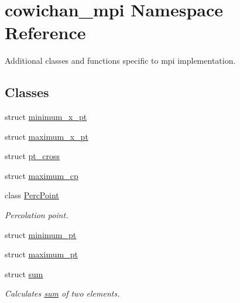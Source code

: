 \hypertarget{namespacecowichan__mpi}{
\section{cowichan\_\-mpi Namespace Reference}
\label{namespacecowichan__mpi}
}
Additional classes and functions specific to mpi implementation.  


\subsection*{Classes}
\begin{CompactItemize}
\item 
struct \hyperlink{structcowichan__mpi_1_1minimum__x__pt}{minimum\_\-x\_\-pt}
\item 
struct \hyperlink{structcowichan__mpi_1_1maximum__x__pt}{maximum\_\-x\_\-pt}
\item 
struct \hyperlink{structcowichan__mpi_1_1pt__cross}{pt\_\-cross}
\item 
struct \hyperlink{structcowichan__mpi_1_1maximum__cp}{maximum\_\-cp}
\item 
class \hyperlink{classcowichan__mpi_1_1_perc_point}{PercPoint}
\begin{CompactList}\small\item\em Percolation point. \item\end{CompactList}\item 
struct \hyperlink{structcowichan__mpi_1_1minimum__pt}{minimum\_\-pt}
\item 
struct \hyperlink{structcowichan__mpi_1_1maximum__pt}{maximum\_\-pt}
\item 
struct \hyperlink{structcowichan__mpi_1_1sum}{sum}
\begin{CompactList}\small\item\em Calculates \hyperlink{structcowichan__mpi_1_1sum}{sum} of two elements. \item\end{CompactList}\end{CompactItemize}

